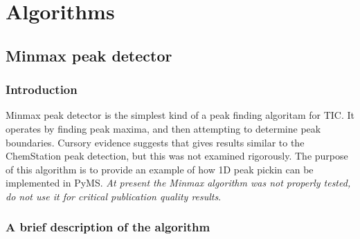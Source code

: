 

\chapter{Algorithms}

\section{Minmax peak detector}

\subsection{Introduction}

Minmax peak detector is the simplest kind of a peak finding algoritam for
TIC. It operates by finding peak maxima, and then attempting to determine
peak boundaries. Cursory evidence suggests that gives results similar to
the ChemStation peak detection, but this was not examined rigorously.
The purpose of this algorithm is to provide an example of how 1D peak
pickin can be implemented in PyMS. {\em At present the Minmax algorithm
was not properly tested, do not use it for critical publication quality
results}.

\subsection{A brief description of the algorithm}

